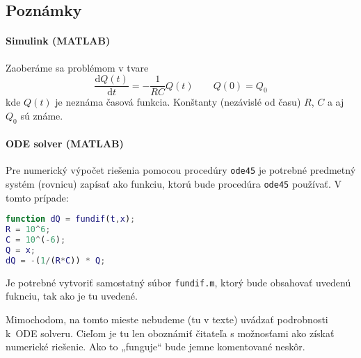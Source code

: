 \documentclass[a4paper, 10pt, ]{article}
\begin{document}
\subsection{Poznámky}


\paragraph{Simulink (MATLAB)}

Zaoberáme sa problémom v tvare
\begin{equation} \label{diffRbeta222}
    \frac{\text{d}Q(t)}{\text{d}t} = - \frac{1}{RC} Q(t) \qquad Q(0) = Q_0
\end{equation}
kde $Q(t)$ je neznáma časová funkcia. Konštanty (nezávislé od času) $R$, $C$ a aj $Q_0$ sú známe.


\begin{center}

    \vspace{-1mm}


    \vspace{-5mm}

	\label{sim_Q}

    \vspace{-1mm}

\end{center}




\paragraph{ODE solver (MATLAB)}

Pre numerický výpočet riešenia pomocou procedúry \verb|ode45| je potrebné predmetný systém (rovnicu) zapísať ako funkciu, ktorú bude procedúra \verb|ode45| používať. V tomto prípade:
\begin{lstlisting}[language=Matlab,]
function dQ = fundif(t,x);
R = 10^6;
C = 10^(-6);
Q = x;
dQ = -(1/(R*C)) * Q;
\end{lstlisting}
Je potrebné vytvoriť samostatný súbor \verb|fundif.m|, ktorý bude obsahovať uvedenú fuknciu, tak ako je tu uvedené.

Mimochodom, na tomto mieste nebudeme (tu v texte) uvádzať podrobnosti k~ODE solveru. Cieľom je tu len oboznámiť čitateľa s možnosťami ako získať numerické riešenie. Ako to „funguje“ bude jemne komentované neskôr.
\end{document}
